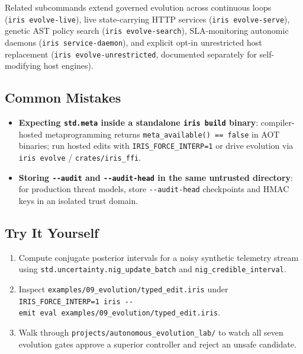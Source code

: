 \documentclass[
  english,
  oneside]{book}
\providecommand{\tightlist}{%
  \setlength{\itemsep}{0pt}\setlength{\parskip}{0pt}}
\begin{document}
Related subcommands extend governed evolution across continuous loops
(\texttt{iris\ evolve-live}), live state-carrying HTTP services
(\texttt{iris\ evolve-serve}), genetic AST policy search
(\texttt{iris\ evolve-search}), SLA-monitoring autonomic daemons
(\texttt{iris\ service-daemon}), and explicit opt-in unrestricted host
replacement (\texttt{iris\ evolve-unrestricted}, documented separately
for self-modifying host engines).

\subsection{Common Mistakes}\label{common-mistakes-14}

\begin{itemize}
\tightlist
\item
  \textbf{Expecting \texttt{std.meta} inside a standalone
  \texttt{iris\ build} binary}: compiler-hosted metaprogramming returns
  \texttt{meta\_available()\ ==\ false} in AOT binaries; run hosted
  edits with \texttt{IRIS\_FORCE\_INTERP=1} or drive evolution via
  \texttt{iris\ evolve} / \texttt{crates/iris\_ffi}.
\item
  \textbf{Storing \texttt{-\/-audit} and \texttt{-\/-audit-head} in the
  same untrusted directory}: for production threat models, store
  \texttt{-\/-audit-head} checkpoints and HMAC keys in an isolated trust
  domain.
\end{itemize}

\subsection{Try It Yourself}\label{try-it-yourself-14}

\begin{enumerate}
\def\labelenumi{\arabic{enumi}.}
\tightlist
\item
  Compute conjugate posterior intervals for a noisy synthetic telemetry
  stream using \texttt{std.uncertainty.nig\_update\_batch} and
  \texttt{nig\_credible\_interval}.
\item
  Inspect \texttt{examples/09\_evolution/typed\_edit.iris} under
  \texttt{IRIS\_FORCE\_INTERP=1\ iris\ -\/-emit\ eval\ examples/09\_evolution/typed\_edit.iris}.
\item
  Walk through \texttt{projects/autonomous\_evolution\_lab/} to watch
  all seven evolution gates approve a superior controller and reject an
  unsafe candidate.
\end{enumerate}
\end{document}
